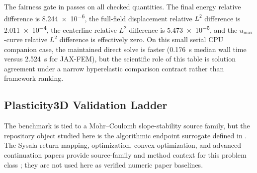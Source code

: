 \begin{table}[H]
  \centering
  
  \caption{Fairness-gated hyperelastic companion comparison against JAX-FEM.}
  \label{tab:hyperelasticity-jaxfem-baseline}
\end{table}

The fairness gate in  passes on all
checked quantities. The final energy relative difference is
\num{8.244e-6}, the full-field displacement relative $L^2$ difference is
\num{2.011e-4}, the centerline relative $L^2$ difference is
\num{5.473e-5}, and the $u_{\max}$-curve relative $L^2$ difference is
effectively zero. On this small serial CPU companion case, the maintained
direct solve is faster (\SI{0.176}{s} median wall time versus \SI{2.524}{s}
for JAX-FEM), but the scientific role of this table is solution agreement
under a narrow hyperelastic comparison contract rather than framework ranking.

\subsection{Plasticity3D Validation Ladder}
\label{sec:val-plasticity3d}

The \plasticitythree{} benchmark is tied to a Mohr--Coulomb slope-stability
source family, but the repository object studied here is the algorithmic
endpoint surrogate defined in
.
The Sysala return-mapping, optimization, convex-optimization, and advanced
continuation papers provide source-family and method context for this problem
class \citep{sysala2017returnmapping,sysala2021optimization,sysala2025convexoptimization,sysala2025advancedcontinuation};
they are not used here as verified numeric paper baselines.

